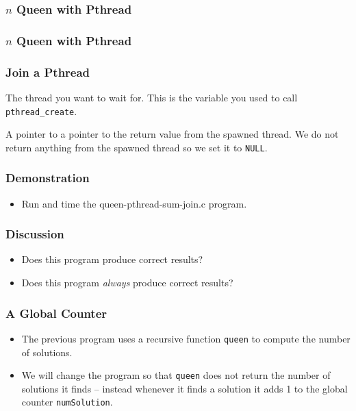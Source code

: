 \documentclass{beamer}
\begin{document}
\begin{frame}
\frametitle{$n$ Queen with Pthread}
\end{frame}


\begin{frame}
\frametitle{$n$ Queen with Pthread}
\end{frame}

\begin{frame}
\frametitle{Join a Pthread}
\begin{description}[l]
\item[\tt thread] The thread you want to wait for.  This is the
  variable you used to call {\tt pthread\_create}.
\item[\tt value\_ptr] A pointer to a pointer to the return value from
  the spawned thread.  We do not return anything from the spawned
  thread so we set it to {\tt NULL}.
\end{description}
\end{frame}

\begin{frame}
\frametitle{Demonstration}
\begin{itemize}
\item Run and time the queen-pthread-sum-join.c program.
\end{itemize}
\end{frame}

\begin{frame}
\frametitle{Discussion}
\begin{itemize}
\item Does this program produce correct results?
\item Does this program {\em always} produce correct results?
\end{itemize}
\end{frame}

\begin{frame}
\frametitle{A Global Counter}
\begin{itemize}
\item The previous program uses a recursive function {\tt queen} to
  compute the number of solutions.
\item We will change the program so that {\tt queen} does not return
  the number of solutions it finds -- instead whenever it finds a
  solution it adds 1 to the global counter {\tt numSolution}.
\end{itemize}
\end{frame}
\end{document}

